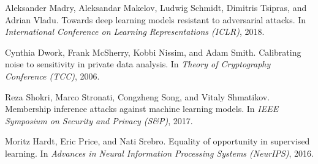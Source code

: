\documentclass[11pt]{article}
\theoremstyle{plain} %
\begin{document}
\begin{thebibliography}{99}
Aleksander Madry, Aleksandar Makelov, Ludwig Schmidt, Dimitris Tsipras, and Adrian Vladu.
\newblock Towards deep learning models resistant to adversarial attacks.
\newblock In \emph{International Conference on Learning Representations (ICLR)}, 2018.

Cynthia Dwork, Frank McSherry, Kobbi Nissim, and Adam Smith.
\newblock Calibrating noise to sensitivity in private data analysis.
\newblock In \emph{Theory of Cryptography Conference (TCC)}, 2006.

Reza Shokri, Marco Stronati, Congzheng Song, and Vitaly Shmatikov.
\newblock Membership inference attacks against machine learning models.
\newblock In \emph{IEEE Symposium on Security and Privacy (S&P)}, 2017.

Moritz Hardt, Eric Price, and Nati Srebro.
\newblock Equality of opportunity in supervised learning.
\newblock In \emph{Advances in Neural Information Processing Systems (NeurIPS)}, 2016.




\end{thebibliography}
\end{document}
